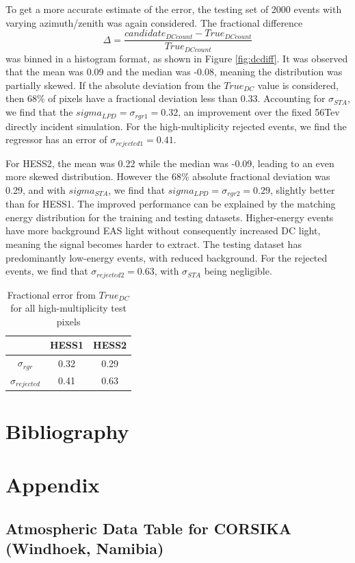 \documentclass[11pt]{article}
\begin{document}
To get a more accurate estimate of the error, the testing set of 2000 events with varying azimuth/zenith was again considered. The fractional difference \[  \Delta = \frac{ candidate_{DC count} - True_{DC count}}{True_{DC count}} \] was binned in a histogram format, as shown in Figure \ref{fig:dcdiff}. It was observed that the mean was 0.09 and the median was -0.08, meaning the distribution was partially skewed. If the absolute deviation from the $True_{DC}$ value is considered, then 68\% of pixels have a fractional deviation less than 0.33. Accounting for $\sigma_{STA}$, we find that the $sigma_{LPD}=\sigma_{rgr1}=0.32$, an improvement over the fixed 56Tev directly incident simulation. For the high-multiplicity rejected events, we find the regressor has an error of $\sigma_{rejected1}=0.41$.

For HESS2, the mean was 0.22 while the median was -0.09, leading to an even more skewed distribution. However the 68\% absolute fractional deviation was 0.29, and with $sigma_{STA}$, we find that $sigma_{LPD}=\sigma_{rgr2}=0.29$, slightly better than for HESS1. The improved performance can be explained by the matching energy distribution for the training and testing datasets. Higher-energy events have more background EAS light without consequently increased DC light, meaning the signal becomes harder to extract. The testing dataset has predominantly low-energy events, with reduced background. For the rejected events, we find that $\sigma_{rejected2}=0.63$, with $\sigma_{STA}$ being negligible.

\begin{table}[h!]
  \centering
  \caption{Fractional error from $True_{DC}$ for all high-multiplicity test pixels}
  \label{tab:altlpderror}
  \begin{tabular}{ccc}
    \toprule
    & HESS1 & HESS2\\
    \midrule
    $\sigma_{rgr}$ & 0.32 & 0.29\\ 
    $\sigma_{rejected}$ & 0.41 & 0.63\\ 
    \bottomrule
  \end{tabular}
\end{table}
\section{Bibliography}


\section{Appendix}
\subsection{Atmospheric Data Table for CORSIKA (Windhoek, Namibia)}
\begin{center}
\begin{small}
\end{small}
\end{center}
\end{document}
